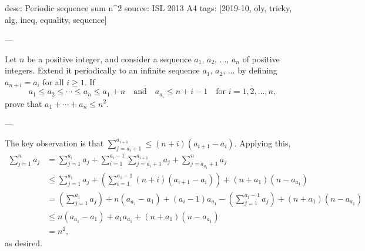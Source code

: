 desc: Periodic sequence sum n^2
source: ISL 2013 A4
tags: [2019-10, oly, tricky, alg, ineq, equality, sequence]

---

Let $n$ be a positive integer, and consider a sequence $a_1$, $a_2$, $\ldots$, $a_n$ of positive integers. Extend it periodically to an infinite sequence $a_1$, $a_2$, $\ldots$ by defining $a_{n+i}=a_i$ for all $i\ge1$. If \[a_1\le a_2\le\cdots\le a_n\le a_1+n\quad\text{and}\quad a_{a_i}\le n+i-1\quad\text{for }i=1,2,\ldots,n,\]
prove that $a_1+\cdots+a_n\le n^2$.

---

The key observation is that $\sum_{j=a_i+1}^{a_{i+1}}\le(n+i)(a_{i+1}-a_i)$. Applying this,
\begin{align*}
    \sum_{j=1}^na_j&=\sum_{j=1}^{a_i}a_j+\sum_{i=1}^{a_i-1}\sum_{j=a_i+1}^{a_{i+1}}a_j+\sum_{j=a_{a_1}+1}^na_j\\
    &\le\sum_{j=1}^{a_1}a_j+\left(\sum_{i=1}^{a_1-1}(n+i)(a_{i+1}-a_i)\right)+(n+a_1)(n-a_{a_1})\\
    &=\left(\sum_{j=1}^{a_1}a_j\right)+n(a_{a_1}-a_1)+(a_i-1)a_{a_1}-\left(\sum_{j=1}^{a_1-1}a_j\right)+(n+a_1)(n-a_{a_1})\\
    &\le n(a_{a_1}-a_1)+a_1a_{a_1}+(n+a_1)(n-a_{a_1})\\
    &=n^2,
\end{align*}
as desired.

